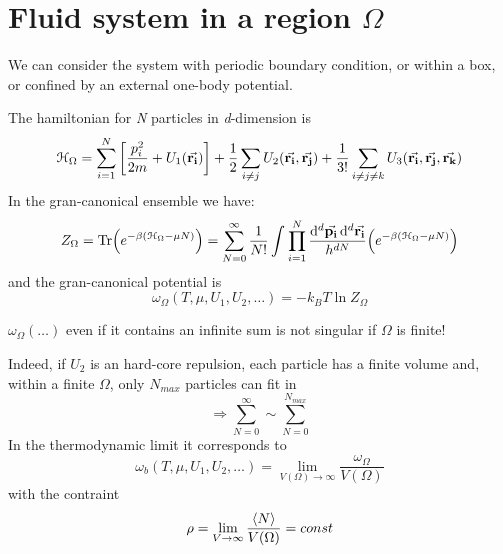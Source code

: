 \documentclass[../main/main.tex]{subfiles}
\begin{document}
\section{Fluid system in a region \( \Omega  \) }
We can consider the system with periodic boundary condition, or within a box, or confined by an external one-body potential.

The hamiltonian for \emph{N} particles in \emph{d}-dimension is
\begin{equation}
  \mathcal{H}_ \Omega = \sum_{i=1}^{N} \qty[\frac{p_i^2}{2m} + U_1 (\va{r_i})] + \frac{1}{2} \sum_{i \neq j}^{} U_2 (\va{r_i}, \va{r_j}) + \frac{1}{3!} \sum_{i \neq j \neq k }^{}  U_3 (\va{r_i}, \va{r_j}, \va{r_k})
\end{equation}
In the gran-canonical ensemble we have:
\begin{equation}
  Z_ \Omega = \Tr(e^{-\beta (\mathcal{H}_ \Omega  - \mu N)} ) = \sum_{N=0}^{\infty } \frac{1}{N!} \int_{}^{} \prod_{i=1}^{N} \frac{\dd[d]{\va{p_i}} \dd[d]{\va{r_i}} }{h^{dN}} \qty(e^{-\beta (\mathcal{H}_ \Omega  - \mu N)} )
\end{equation}
and the gran-canonical potential is
\begin{equation}
  \omega _ \Omega (T, \mu , U_1, U_2, \dots) = -k_B T \ln{Z_ \Omega }
\end{equation}
\begin{remark}
\( \omega _ \Omega (\dots) \) even if it contains an infinite sum is not singular if \( \Omega  \) is finite!
\end{remark}
Indeed, if \( U_2 \) is an hard-core repulsion, each particle has a finite volume and, within a finite \( \Omega  \), only \( N_{max} \) particles can fit in
\begin{equation*}
  \Rightarrow \sum_{N=0}^{\infty } \sim \sum_{N=0}^{N_{max}}
\end{equation*}
In the thermodynamic limit it corresponds to
\begin{equation}
  \omega _ b (T, \mu , U_1, U_2, \dots) = \lim_{V (\Omega ) \rightarrow \infty } \frac{\omega
  _ \Omega }{V (\Omega )}
\end{equation}
with the contraint
\begin{equation*}
  \rho = \lim_{V \rightarrow \infty } \frac{\expval{N} }{V (\Omega ) } = const
\end{equation*}
\end{document}
